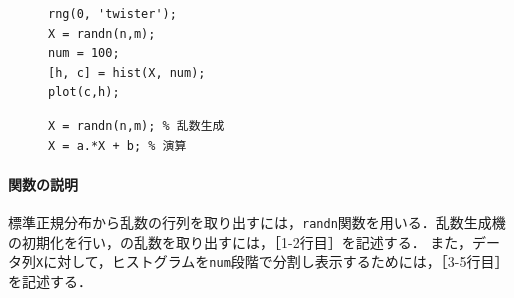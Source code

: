 \begin{figure}
    \vspace{-.5cm}
    \begin{lstlisting}[caption={乱数生成・ヒストグラム},label={src:乱数生成・ヒストグラム},xleftmargin=3mm]
rng(0, 'twister');
X = randn(n,m);
num = 100;
[h, c] = hist(X, num);
plot(c,h);
    \end{lstlisting}
    \begin{lstlisting}[caption={平均と標準偏差の変更},label={src:平均と標準偏差の変更},numbers={none},xleftmargin=3mm]
X = randn(n,m); % 乱数生成
X = a.*X + b; % 演算
    \end{lstlisting}
    \vspace{-1cm}
\end{figure}
\method
\paragraph{\matlab 関数の説明}標準正規分布から乱数の行列を取り出すには，\texttt{randn}関数を用いる．乱数生成機の初期化を行い，の乱数を取り出すには，［1-2行目］を記述する．
また，データ列\texttt{X}に対して，ヒストグラムを\texttt{num}段階で分割し表示するためには，［3-5行目］を記述する．
